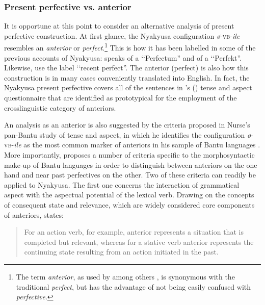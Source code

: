 \subsubsection{Present perfective vs. anterior}\label{PRSPFVvsAnterior}
It is opportune at this point to consider an alternative analysis of present perfective construction. At first glance, the Nyakyusa configuration \textit{ø}-\textsc{vb}-\textit{ile} resembles an \textit{anterior} or \textit{perfect}.\footnote{The term \textit{anterior}, as used by among others \citet{BybeePerkinsPaglucia1994}, is synonymous with the traditional \textit{perfect}, but has the advantage of not being easily confused with \textit{perfective}.} This is how it has been labelled in some of the previous accounts of Nyakyusa: \citet{SchumannK1899} speaks of a \lq\lq Perfectum'' and \citet{EndemannC1914} of a \lq\lq Perfekt''. Likewise, \citet{MwangokaNVoorhoeveJ1960b} use the label \lq\lq recent perfect''. The anterior (perfect) is also how this construction is in many cases conveniently translated into English. In fact, the Nyakyusa present perfective covers all of the sentences in \citeauthor{DahlOe1985}'s (\citeyear{DahlOe1985}) tense and aspect questionnaire that are identified as prototypical for the employment of the crosslinguistic category of anteriors.

An analysis as an anterior is also suggested by the criteria proposed in Nurse's pan-Bantu study of tense and aspect, in which he identifies the configuration \mbox{\textit{ø}-}\textsc{vb}\mbox{-\textit{ile}} as the most common marker of anteriors in his sample of Bantu languages \citep[156]{NurseD2008}. More importantly, \citet[95--99]{NurseD2008} proposes a number of criteria specific to the morphosyntactic make-up of Bantu languages in order to distinguish between anteriors on the one hand and near past perfectives on the other. Two of these criteria can readily be applied to Nyakyusa. The first one concerns the interaction of grammatical aspect with the aspectual potential of the lexical verb. Drawing on the concepts of consequent state and relevance, which are widely considered core components of anteriors, \citeauthor{NurseD2008} states:
\begin{quote}
For an action verb, for example, anterior represents a situation that is completed but relevant, whereas for a stative verb anterior represents the continuing state resulting from an action initiated in the past. \citep[73]{NurseD2008}
\end{quote}

